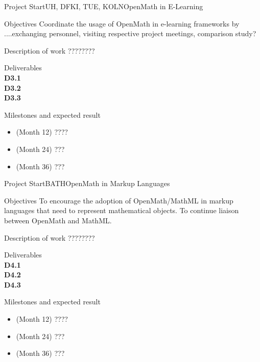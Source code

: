 \documentclass{euproposal}
\begin{document}
\begin{workpackage}{36}{3}{Project Start}{UH, DFKI, TUE, KOLN}{OpenMath in E-Learning}
\begin{wpbox}{Objectives}
  Coordinate the usage of OpenMath in e-learning frameworks by
  ....exchanging personnel, visiting respective project meetings,
  comparison study?
\end{wpbox}
\begin{wpbox}{Description of work}
  ????????
\end{wpbox}
\begin{wpbox}{Deliverables\\}
{\bf D3.1} \\
{\bf D3.2} \\
{\bf D3.3} 
\end{wpbox}
\begin{wpbox}{Milestones and expected result}
\begin{itemize}
\item (Month 12) ????
\item (Month 24) ???
\item (Month 36) ???
\end{itemize}
\end{wpbox}
\end{workpackage}
\newpage
\begin{workpackage}{36}{4}{Project Start}{BATH}{OpenMath in Markup Languages}
\begin{wpbox}{Objectives}
  To encourage the adoption of OpenMath/MathML in markup languages
  that need to represent mathematical objects.  To continue liaison
  between OpenMath and MathML.
\end{wpbox}
\begin{wpbox}{Description of work}
  ????????
\end{wpbox}
\begin{wpbox}{Deliverables\\}
{\bf D4.1} \\
{\bf D4.2} \\
{\bf D4.3} \\
\end{wpbox}
\begin{wpbox}{Milestones and expected result}
\begin{itemize}
\item (Month 12) ????
\item (Month 24) ???
\item (Month 36) ???
\end{itemize}
\end{wpbox}
\end{workpackage}
\newpage
\end{document}
